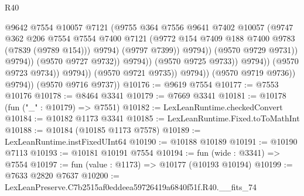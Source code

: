 \begin{lexlean}{R40}
\begin{coremodule}
                                              @9642
                                              @7554
                                              @10057
                                              @7121
                                              (@9755
                                                @364
                                                @7556
                                                @9641
                                                @7402
                                                @10057
                                                (@9747
                                                  @362
                                                  @206
                                                  @7554
                                                  @7554
                                                  @7400
                                                  @7121
                                                  (@9772
                                                    @154
                                                    @7409
                                                    @188
                                                    @7400
                                                    @9783
                                                    (@7839 (@9789 @154)))
                                                  @9794)
                                                (@9797 @7399))
                                              @9794))
                                          (@9570 @9729 @9731))
                                        @9794))
                                    (@9570 @9727 @9732))
                                  @9794))
                              (@9570 @9725 @9733))
                            @9794))
                        (@9570 @9723 @9734))
                      @9794))
                  (@9570 @9721 @9735))
                @9794))
            (@9570 @9719 @9736))
          @9794))
      (@9570 @9716 @9737))
@10176 := @9619 @7554
@10177 := @7553 @10176
@10178 := @8464 @3341
@10179 := @7669 @3341
@10181 := @10178 (fun ("_" : @10179) => @7551)
@10182 := LexLeanRuntime.checkedConvert
@10184 := @10182 @1173 @3341
@10185 := LexLeanRuntime.Fixed.toToMathInt
@10188 := @10184 (@10185 @1173 @7578)
@10189 := LexLeanRuntime.instFixedUInt64
@10190 := @10188 @10189
@10191 := @10190 @7113
@10193 := @10181 @10191 @7554
@10194 := fun (wide : @3341) => @7554
@10197 := fun (value : @1173) => @10177 (@10193 @10194)
@10199 := @7633 @2820 @7637
@10200 := LexLeanPreserve.C7b2515af0eddeea59726419a6840f51f.R40.__fits_74

\end{coremodule}
\end{lexlean}
